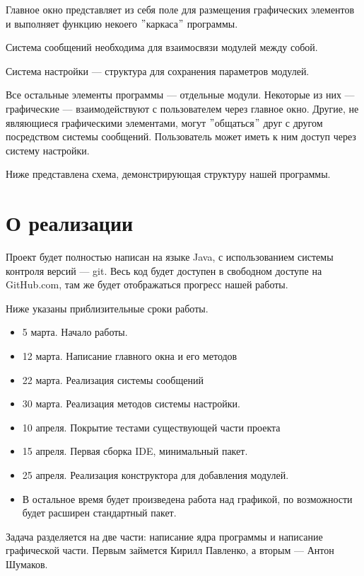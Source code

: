 \documentclass[12pt]{article}
\begin{document}
Главное окно представляет из себя поле для размещения графических элементов и выполняет функцию некоего $"$каркаса$"$ программы. 

Система сообщений необходима для взаимосвязи модулей между собой. 

Система настройки --- структура для сохранения параметров модулей.

Все остальные элементы программы --- отдельные модули. Некоторые из них --- графические --- взаимодействуют с пользователем через главное окно. Другие, не являющиеся графическими элементами, могут $"$общаться$"$ друг с другом посредством системы сообщений. Пользователь может иметь к ним доступ через систему настройки. 


Ниже представлена схема, демонстрирующая структуру нашей программы.



\section{О реализации}

Проект будет полностью написан на языке Java, с использованием системы контроля версий --- git. Весь код будет доступен в свободном доступе на GitHub.com, там же будет отображаться прогресс нашей работы.

Ниже указаны приблизительные сроки работы.
\begin{itemize}
\item 5 марта. Начало работы.
\item 12 марта. Написание главного окна и его методов 
\item 22 марта. Реализация системы сообщений
\item 30 марта. Реализация методов системы настройки.
\item 10 апреля. Покрытие тестами существующей части проекта
\item 15 апреля. Первая сборка IDE, минимальный пакет.
\item 25 апреля. Реализация конструктора для добавления модулей.
\item В остальное время будет произведена работа над графикой, по возможности будет расширен стандартный пакет.
\end{itemize}

Задача разделяется на две части: написание ядра программы и написание графической части. Первым займется Кирилл Павленко, а вторым --- Антон Шумаков.
\end{document}
